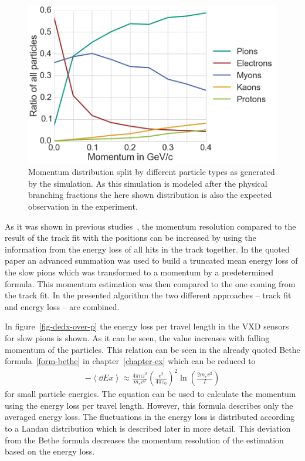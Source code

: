 \begin{figure}
 \centering
 \includegraphics[width=0.7\linewidth]{figures/vxd/momentumDistribution.png}
 \caption[Momentum distribution by different particle types.]{Momentum distribution split by different particle types as generated by the simulation. As this simulation is modeled after the physical branching fractions the here shown distribution is also the expected observation in the experiment.}
 \label{fig-particles-momentum}
\end{figure}

As it was shown in previous studies~\cite{robert}, the momentum resolution compared to the result of the track fit with the positions can be increased by using the information from the energy loss of all hits in the track together. In the quoted paper an advanced summation was used to build a truncated mean energy loss of the slow pions which was transformed to a momentum by a predetermined formula. This momentum estimation was then compared to the one coming from the track fit. In the presented algorithm the two different approaches -- track fit and energy loss -- are combined.

In figure~\ref{fig-dedx-over-p} the energy loss per travel length in the VXD sensors for slow pions is shown. As it can be seen, the \dedx value increases with falling momentum of the particles. This relation can be seen in the already quoted Bethe formula~\ref{form-bethe} in chapter~\ref{chapter-ex} which can be reduced to 
\begin{align}
 -\left \langle \dd{E}{x} \right\rangle \approx \frac{4 \pi n z^2}{m_e v^2} \left( \frac{e^2}{4 \pi \varepsilon_0} \right)^2 \ln \left( \frac{2 m_e v^2}{I} \right) \label{form-bethe-simpl}
\end{align}
for small particle energies. The equation can be used to calculate the momentum using the energy loss per travel length. However, this formula describes only the averaged energy loss. The fluctuations in the energy loss is distributed according to a Landau distribution which is described later in more detail. This deviation from the Bethe formula decreases the momentum resolution of the estimation based on the energy loss.

